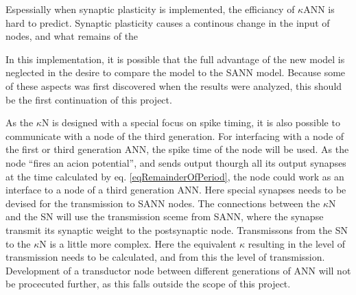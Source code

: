 Espessially when synaptic plasticity is implemented, the efficiancy of $\kappa$ANN is hard to predict.
Synaptic plasticity causes a continous change in the input of nodes, and what remains of the 


In this implementation, it is possible that the full advantage of the new model is neglected in the desire to compare the model to the SANN model.
Because some of these aspects was first discovered when the results were analyzed, this should be the first continuation of this project.			%



	As the $\kappa$N is designed with a special focus on spike timing, it is also possible to communicate with a node of the third generation.
	For interfacing with a node of the first or third generation ANN, the spike time of the node will be used. %
	As the node ``fires an acion potential'', and sends output thourgh all its output synapses at the time calculated by eq. \eqref{eqRemainderOfPeriod}, the node could work as an interface to a node of a third generation ANN. 
	Here special synapses needs to be devised for the transmission to SANN nodes. 
	The connections between the $\kappa$N and the SN will use the transmission sceme from SANN, where the synapse transmit its synaptic weight to the postsynaptic node. 
	Transmissons from the SN to  the $\kappa$N is a little more complex. Here the equivalent $\kappa$ resulting in the level of transmission needs to be calculated, and from this the level of transmission.
	Development of a transductor node between different generations of ANN will not be procecuted further, as this falls outside the scope of this project.


